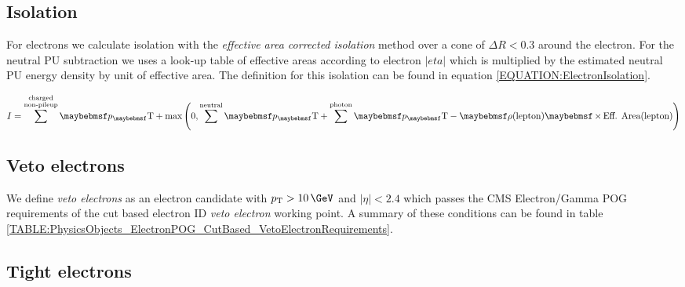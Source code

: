 \subsection{Isolation}
\label{SUBSECTION:EventReconstructionAndSimulation_LeptonIsolation_Isolation}



For electrons we calculate isolation with the \textit{effective area corrected isolation} method over a cone of $\Delta R<0.3$ around the electron. For the neutral \gls{PU} subtraction we uses a look-up table of effective areas according to electron $|eta|$ which is multiplied by the estimated neutral \gls{PU} energy density by unit of effective area. The definition for this isolation can be found in equation \ref{EQUATION:ElectronIsolation}.

\begin{equation}
I = \sum^{\substack{\text{charged} \\ \text{non-pileup}}}\pT +
\text{max}\left(0,\sum^{\text{neutral}}\pT+\sum^{\text{photon}}\pT - \rho(\text{lepton}) \times \text{Eff. Area}(\text{lepton})\right)
\label{EQUATION:ElectronIsolation}
\end{equation}

\subsection{Veto electrons}

We define \textit{veto electrons} as an electron candidate with $\pt>10\,\GeV$ and $|\eta|<2.4$ which passes the \gls{CMS} Electron/Gamma \gls{POG} \cite{ARTICLE:CMSElectronReconstruction7TeV} requirements of the cut based electron \gls{ID} \textit{veto electron} working point. A summary of these conditions can be found in table \ref{TABLE:PhysicsObjects_ElectronPOG_CutBased_VetoElectronRequirements}.
 


\subsection{Tight electrons}

